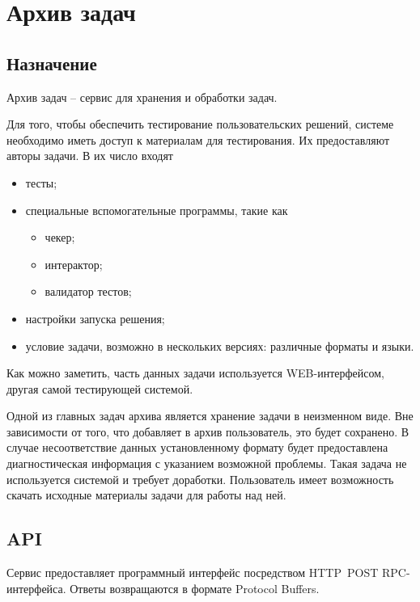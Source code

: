 \section{Архив задач}
\subsection{Назначение}
Архив задач -- сервис для хранения и обработки задач.

Для того, чтобы обеспечить тестирование пользовательских решений,
системе необходимо иметь доступ к материалам для тестирования.
Их предоставляют авторы задачи. В их число входят
\begin{itemize}
    \item тесты;
    \item специальные вспомогательные программы, такие как
        \begin{itemize}
            \item чекер;
            \item интерактор;
            \item валидатор тестов;
        \end{itemize}
    \item настройки запуска решения;
    \item условие задачи, возможно в нескольких версиях: различные форматы и языки.
\end{itemize}

Как можно заметить, часть данных задачи используется WEB-интерфейсом,
другая самой тестирующей системой.

Одной из главных задач архива является хранение задачи
в неизменном виде. Вне зависимости от того, что добавляет
в архив пользователь, это будет сохранено. В случае несоответствие
данных установленному формату будет предоставлена диагностическая информация
с указанием возможной проблемы. Такая задача не используется системой и требует
доработки. Пользователь имеет возможность скачать исходные материалы задачи
для работы над ней.

\subsection{API}
Сервис предоставляет программный интерфейс посредством
HTTP~POST RPC-интерфейса. Ответы возвращаются в формате Protocol Buffers.

